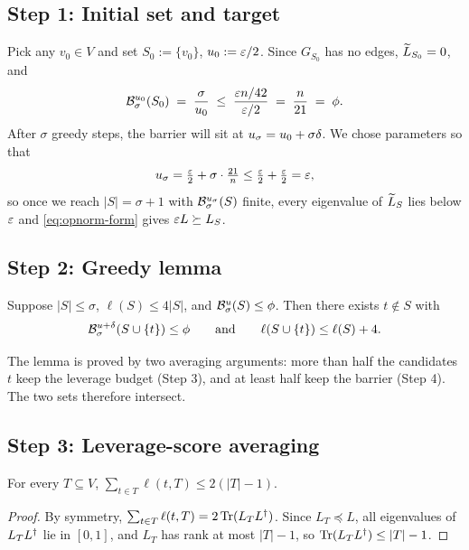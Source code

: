 \documentclass[11pt]{article}
\begin{document}
\subsection*{Step 1: Initial set and target}

Pick any $v_0\in V$ and set $S_0:=\{v_0\}$, $u_0:=\varepsilon/2$. Since $G_{S_0}$ has
no edges, $\widetilde{L}_{S_0}=0$, and
\[
  \mathcal{B}^{u_0}_{\sigma}(S_0) \;=\; \frac{\sigma}{u_0}
   \;\le\; \frac{\varepsilon n/42}{\varepsilon/2} \;=\; \frac{n}{21} \;=\; \phi.
\]
After $\sigma$ greedy steps, the barrier will sit at $u_\sigma=u_0+\sigma\delta$.
We chose parameters so that
\[
  u_\sigma = \tfrac{\varepsilon}{2} + \sigma\cdot\tfrac{21}{n}
           \le \tfrac{\varepsilon}{2} + \tfrac{\varepsilon}{2} = \varepsilon,
\]
so once we reach $|S|=\sigma+1$ with $\mathcal{B}^{u_\sigma}_{\sigma}(S)$ finite, every
eigenvalue of $\widetilde{L}_S$ lies below $\varepsilon$ and \eqref{eq:opnorm-form} gives
$\varepsilon L\succeq L_S$.

\subsection*{Step 2: Greedy lemma}

\begin{qsixlemma}\label{lem:greedy}
Suppose $|S|\le\sigma$, $\ell(S)\le 4|S|$, and $\mathcal{B}^{u}_{\sigma}(S)\le\phi$. Then
there exists $t\notin S$ with
\[
  \mathcal{B}^{u+\delta}_{\sigma}(S\cup\{t\})\le\phi
  \qquad\text{and}\qquad
  \ell(S\cup\{t\})\le\ell(S)+4.
\]
\end{qsixlemma}

\noindent The lemma is proved by two averaging arguments: more than half the
candidates $t$ keep the leverage budget (Step 3), and at least half keep the
barrier (Step 4). The two sets therefore intersect.

\subsection*{Step 3: Leverage-score averaging}

\begin{qsixclaim}\label{cl:Tlev}
For every $T\subseteq V$, $\sum_{t\in T}\ell(t,T)\le 2(|T|-1)$.
\end{qsixclaim}
\begin{proof}
By symmetry, $\sum_{t\in T}\ell(t,T)=2\operatorname{Tr}(L_TL^{\dagger})$. Since $L_T\preceq L$, all
eigenvalues of $L_TL^{\dagger}$ lie in $[0,1]$, and $L_T$ has rank at most $|T|-1$, so
$\operatorname{Tr}(L_TL^{\dagger})\le|T|-1$.
\end{proof}
\end{document}
